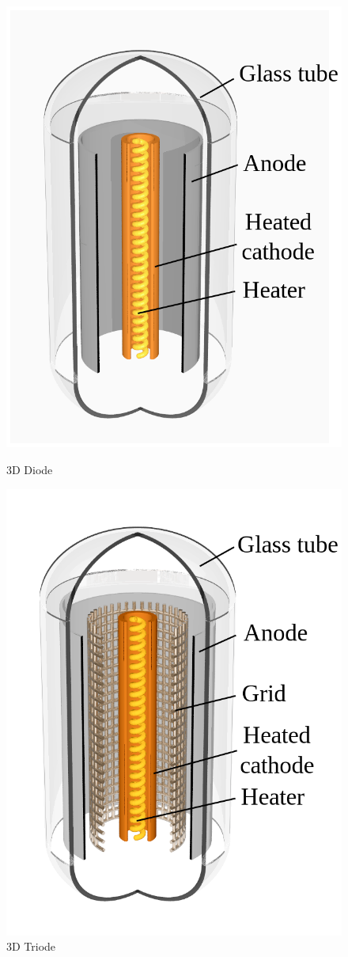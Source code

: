 \documentclass[11pt]{article}
\begin{document}
\begin{figure}[H]
\centering
\begin{minipage}{0.3\textwidth}
  \centering
  \includegraphics[width=0.8\linewidth]{diode.png}%
  \caption{3D Diode}%
  \label{fig:diode}
\end{minipage}%
\begin{minipage}{.3\textwidth}
  \centering
  \includegraphics[width=0.8\linewidth]{triode.png}%
  \caption{3D Triode}
  \label{fig:triode}
\end{minipage}
\end{figure}
\end{document}
